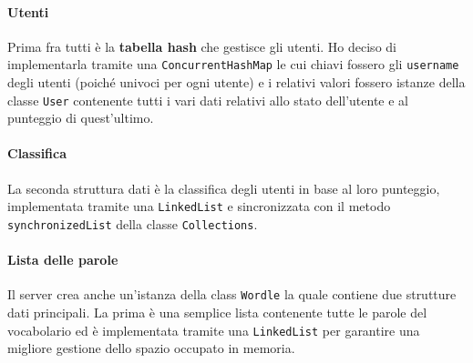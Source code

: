 \paragraph{Utenti}
Prima fra tutti è la \textbf{tabella hash} che gestisce gli utenti. Ho deciso di implementarla
tramite una \verb|ConcurrentHashMap| le cui chiavi fossero gli \verb|username| degli utenti (poiché
univoci per ogni utente) e i relativi valori fossero istanze della classe \verb|User| contenente
tutti i vari dati relativi allo stato dell'utente e al punteggio di quest'ultimo.

\paragraph{Classifica}
La seconda struttura dati è la classifica degli utenti in base al loro punteggio, implementata
tramite una \verb|LinkedList| e sincronizzata con il metodo \verb|synchronizedList| della
classe \verb|Collections|.

\paragraph{Lista delle parole}
Il server crea anche un'istanza della class \verb|Wordle| la quale contiene due strutture dati
principali. La prima è una semplice lista contenente tutte le parole del vocabolario ed è
implementata tramite una \verb|LinkedList| per garantire una migliore gestione dello spazio
occupato in memoria.

